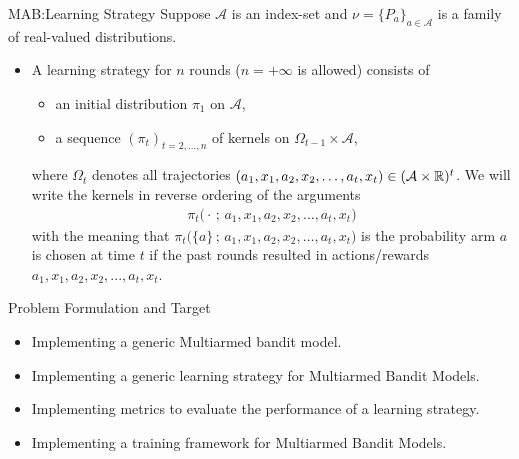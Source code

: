 \begin{frame}
    \begin{ldef}{MAB:Learning Strategy}
            Suppose $\mathcal A$ is an index-set and $\nu = \{P_a\}_{a \in \mathcal A}$ is a family of real-valued distributions. 
            \begin{itemize}
                \item A learning strategy for $n$ rounds ($n=+\infty$ is allowed) consists of
                \begin{itemize}
                    \item an initial distribution $\pi_1$ on $\mathcal A$,
                    \item a sequence $(\pi_t)_{t=2,\dots,n}$ of kernels on $\Omega_{t-1}\times \mathcal A$,
                \end{itemize}
                where $\Omega_t$ denotes all trajectories $(a_1,x_1,a_2,x_2,\dots, a_{t}, x_t)\in (\mathcal A\times \mathbb{R})^t$. We will write the kernels in reverse ordering of the arguments
                \begin{align*}
                    \pi_t\big(\cdot\,;\, a_1,x_1,a_2,x_2,\dots, a_{t}, x_t\big)
                \end{align*}
                with the meaning that $\pi_t\big(\{a\}\,;\, a_1,x_1,a_2,x_2,\dots, a_{t}, x_t\big)$ is the probability arm $a$ is chosen at time $t$ if the past rounds resulted in actions/rewards $a_1,x_1,a_2,x_2,..., a_{t}, x_t$.
            \end{itemize}
\end{ldef}
\end{frame}
\begin{frame}
    \begin{ltarget}{Problem Formulation and Target}
        \begin{itemize}
            \item Implementing a generic Multiarmed bandit model.
            \item Implementing a generic learning strategy for Multiarmed Bandit Models.
            \item Implementing metrics to evaluate the performance of a learning strategy.
            \item Implementing a training framework for Multiarmed Bandit Models.
        \end{itemize}
\end{ltarget}
\end{frame}
